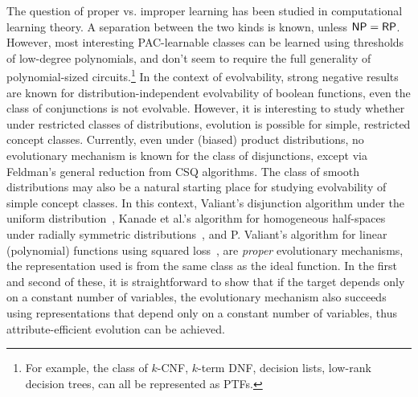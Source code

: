 The question of proper vs. improper learning has been studied in computational
learning theory. A separation between the two kinds is known, unless $\mathsf{NP} =
\mathsf{RP}$. However, most interesting PAC-learnable classes can be learned using
thresholds of low-degree polynomials, and don't seem to require the full
generality of polynomial-sized circuits.\footnote{For example, the class of
$k$-CNF, $k$-term DNF, decision lists, low-rank decision trees, can all be
represented as PTFs.} In the context of evolvability, strong negative results
are known for distribution-independent evolvability of boolean functions, \eg
even the class of conjunctions is not evolvable. However, it is interesting to
study whether under restricted classes of distributions, evolution is possible
for simple, restricted concept classes. Currently, even under (biased) product
distributions, no evolutionary mechanism is known for the class of disjunctions,
except via Feldman's general reduction from CSQ algorithms. The class of
smooth distributions may also be a natural starting place for studying
evolvability of simple concept classes. In this context, Valiant's disjunction
algorithm under the uniform distribution~\cite{Valiant:2009-evolvability},
Kanade et al.'s algorithm for homogeneous half-spaces under radially symmetric
distributions~\cite{KVV:2010-drift}, and P. Valiant's algorithm for linear
(polynomial) functions using squared loss~\cite{Valiant:2012-real}, are
\emph{proper} evolutionary mechanisms, \ie the representation used is from the
same class as the ideal function. In the first and second of these, it is
straightforward to show that if the target depends only on a constant number of
variables, the evolutionary mechanism also succeeds using representations that
depend only on a constant number of variables, thus attribute-efficient
evolution can be achieved.

